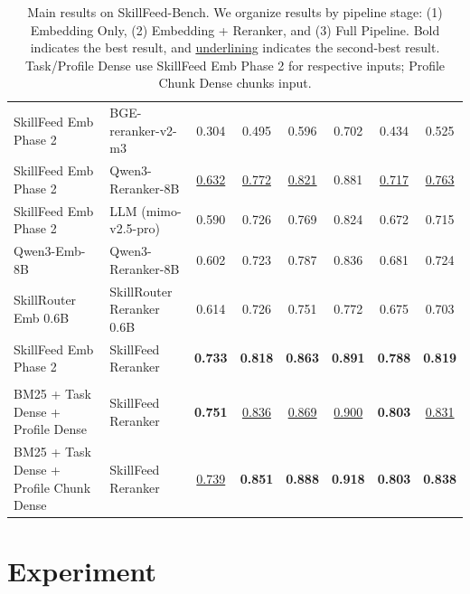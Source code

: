 \documentclass[letterpaper]{article} %
\begin{document}
\begin{table}[!h]
\begin{tabular}{@{}l l c c c c c c@{}}
SkillFeed Emb Phase 2
& BGE-reranker-v2-m3
& 0.304
& 0.495
& 0.596
& 0.702
& 0.434
& 0.525 \\

SkillFeed Emb Phase 2
& Qwen3-Reranker-8B
& \underline{0.632}
& \underline{0.772}
& \underline{0.821}
& 0.881
& \underline{0.717}
& \underline{0.763} \\

SkillFeed Emb Phase 2
& LLM (mimo-v2.5-pro)
& 0.590
& 0.726
& 0.769
& 0.824
& 0.672
& 0.715 \\

Qwen3-Emb-8B
& Qwen3-Reranker-8B
& 0.602
& 0.723
& 0.787
& 0.836
& 0.681
& 0.724 \\

SkillRouter Emb 0.6B
& SkillRouter Reranker 0.6B
& 0.614
& 0.726
& 0.751
& 0.772
& 0.675
& 0.703 \\

SkillFeed Emb Phase 2
& SkillFeed Reranker
& \textbf{0.733}
& \textbf{0.818}
& \textbf{0.863}
& \textbf{0.891}
& \textbf{0.788}
& \textbf{0.819} \\

\addlinespace[3pt]
\midrule
\multicolumn{8}{@{}l}{\textit{(3) Full Pipeline (BM25 + Dense + Reranker)}} \\
\addlinespace[2pt]

BM25 + Task Dense + Profile Dense
& SkillFeed Reranker
& \textbf{0.751}
& \underline{0.836}
& \underline{0.869}
& \underline{0.900}
& \textbf{0.803}
& \underline{0.831} \\

BM25 + Task Dense + Profile Chunk Dense
& SkillFeed Reranker
& \underline{0.739}
& \textbf{0.851}
& \textbf{0.888}
& \textbf{0.918}
& \textbf{0.803}
& \textbf{0.838} \\

\bottomrule
\end{tabular}%
\caption[Main results on SkillFeed-Bench.]{
Main results on SkillFeed-Bench.
We organize results by pipeline stage:
(1) Embedding Only,
(2) Embedding + Reranker, and
(3) Full Pipeline.
Bold indicates the best result, and
\underline{underlining} indicates the second-best result.
Task/Profile Dense use SkillFeed Emb Phase 2 for respective inputs; Profile Chunk Dense chunks input.
}
\label{tab:main_results}
\end{table}

\section{Experiment}
\end{document}
